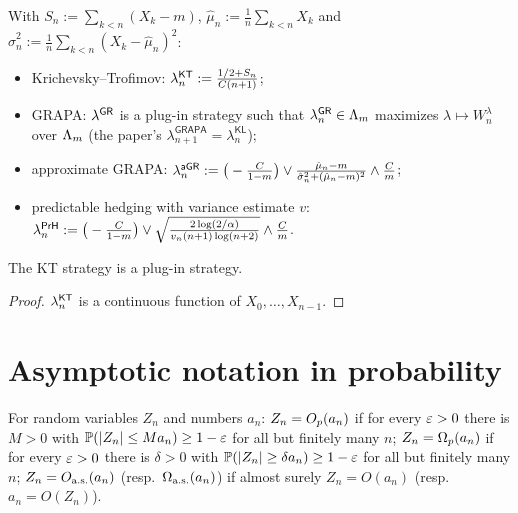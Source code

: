 \begin{definition}
  \label{def:strategies}
  \leanok
  With $S_n := \sum_{k<n} (X_k - m)$, $\hat\mu_n := \frac1n \sum_{k<n} X_k$ and
  $\hat\sigma^2_n := \frac1n \sum_{k<n} (X_k - \hat\mu_n)^2$:
  \begin{itemize}
    \item Krichevsky--Trofimov: $\lambda^{\mathsf{KT}}_n := \frac{1/2 + S_n}{C (n+1)}$;
    \item GRAPA: $\lambda^{\mathsf{GR}}$ is a plug-in strategy such that $\lambda^{\mathsf{GR}}_n \in \Lambda_m$ maximizes
          $\lambda \mapsto W^\lambda_n$ over $\Lambda_m$ (the paper's $\lambda^{\mathsf{GRAPA}}_{n+1} =
          \lambda^{\mathsf{KL}}_n$);
    \item approximate GRAPA: $\lambda^{\mathsf{aGR}}_n := \big(-\frac{C}{1-m}\big) \vee \frac{\hat\mu_n -
          m}{\hat\sigma^2_n + (\hat\mu_n - m)^2} \wedge \frac{C}{m}$;
    \item predictable hedging with variance estimate $v$: $\lambda^{\mathsf{PrH}}_n := \big(-\frac{C}{1-m}\big)
          \vee \sqrt{\frac{2 \log(2/\alpha)}{v_n (n+1) \log(n+2)}} \wedge \frac{C}{m}$.
  \end{itemize}
\end{definition}

\begin{lemma}
  \label{lem:isPlugIn_kt}
  \leanok
  The KT strategy is a plug-in strategy.
\end{lemma}

\begin{proof}
  \leanok
  $\lambda^{\mathsf{KT}}_n$ is a continuous function of $X_0, \dots, X_{n-1}$.
\end{proof}

\section{Asymptotic notation in probability}

\begin{definition}
  \label{def:asymp}
  \leanok
  For random variables $Z_n$ and numbers $a_n$: $Z_n = O_p(a_n)$ if for every $\varepsilon > 0$ there is
  $M > 0$ with $\mathbb{P}(\lvert Z_n \rvert \le M a_n) \ge 1 - \varepsilon$ for all but finitely many $n$;
  $Z_n = \Omega_p(a_n)$ if for every $\varepsilon > 0$ there is $\delta > 0$ with
  $\mathbb{P}(\lvert Z_n \rvert \ge \delta a_n) \ge 1 - \varepsilon$ for all but finitely many $n$; $Z_n = O_{\mathrm{a.s.}}(a_n)$
  (resp.\ $\Omega_{\mathrm{a.s.}}(a_n)$) if almost surely $Z_n = O(a_n)$ (resp.\ $a_n = O(Z_n)$).
\end{definition}

